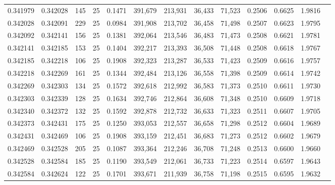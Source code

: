 \begin{tabular}{rrrrrrrrrrrrr}
0.341979 & 0.342028 &   145 &  25 &                                     0.1471 & 391,679 & 213,931 &  36,433 &  71,523 & 0.2506 & 0.6625 & 1.9816 \\
0.342028 & 0.342091 &   229 &  25 &                                     0.0984 & 391,908 & 213,702 &  36,458 &  71,498 & 0.2507 & 0.6623 & 1.9795 \\
0.342092 & 0.342141 &   156 &  25 &                                     0.1381 & 392,064 & 213,546 &  36,483 &  71,473 & 0.2508 & 0.6621 & 1.9781 \\
0.342141 & 0.342185 &   153 &  25 &                                     0.1404 & 392,217 & 213,393 &  36,508 &  71,448 & 0.2508 & 0.6618 & 1.9767 \\
0.342185 & 0.342218 &   106 &  25 &                                     0.1908 & 392,323 & 213,287 &  36,533 &  71,423 & 0.2509 & 0.6616 & 1.9757 \\
0.342218 & 0.342269 &   161 &  25 &                                     0.1344 & 392,484 & 213,126 &  36,558 &  71,398 & 0.2509 & 0.6614 & 1.9742 \\
0.342269 & 0.342303 &   134 &  25 &                                     0.1572 & 392,618 & 212,992 &  36,583 &  71,373 & 0.2510 & 0.6611 & 1.9730 \\
0.342303 & 0.342339 &   128 &  25 &                                     0.1634 & 392,746 & 212,864 &  36,608 &  71,348 & 0.2510 & 0.6609 & 1.9718 \\
0.342340 & 0.342372 &   132 &  25 &                                     0.1592 & 392,878 & 212,732 &  36,633 &  71,323 & 0.2511 & 0.6607 & 1.9705 \\
0.342373 & 0.342431 &   175 &  25 &                                     0.1250 & 393,053 & 212,557 &  36,658 &  71,298 & 0.2512 & 0.6604 & 1.9689 \\
0.342431 & 0.342469 &   106 &  25 &                                     0.1908 & 393,159 & 212,451 &  36,683 &  71,273 & 0.2512 & 0.6602 & 1.9679 \\
0.342469 & 0.342528 &   205 &  25 &                                     0.1087 & 393,364 & 212,246 &  36,708 &  71,248 & 0.2513 & 0.6600 & 1.9660 \\
0.342528 & 0.342584 &   185 &  25 &                                     0.1190 & 393,549 & 212,061 &  36,733 &  71,223 & 0.2514 & 0.6597 & 1.9643 \\
0.342584 & 0.342624 &   122 &  25 &                                     0.1701 & 393,671 & 211,939 &  36,758 &  71,198 & 0.2515 & 0.6595 & 1.9632 \\

\end{tabular}
